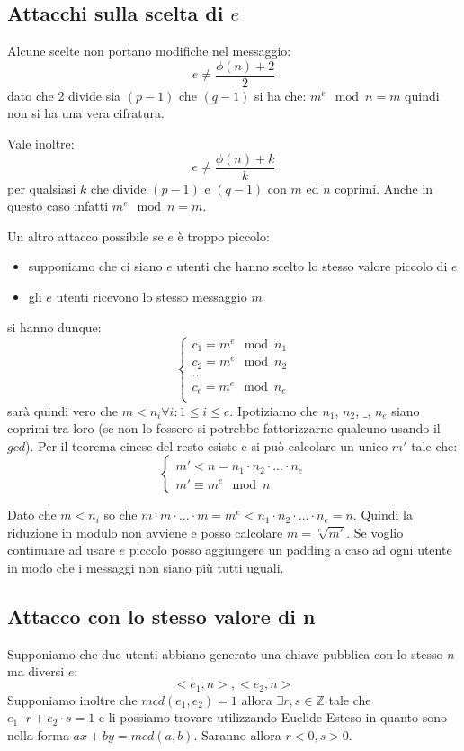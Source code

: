 \subsection{Attacchi sulla scelta di $e$}
Alcune scelte non portano modifiche nel messaggio:
$$ e \neq \frac{\phi(n) + 2}{2} $$
dato che 2 divide sia $(p-1)$ che $(q-1)$ si ha che: $ m^e \mod n = m $
quindi non si ha una vera cifratura.

Vale inoltre:
$$ e \neq \frac{\phi(n) + k}{k} $$
per qualsiasi $k$ che divide $(p-1)$ e $(q-1)$ con $m$ ed $n$ coprimi.
Anche in questo caso infatti $ m^e \mod n = m $.

Un altro attacco possibile se $e$ è troppo piccolo:
\begin{itemize}
    \item supponiamo che ci siano $e$ utenti che hanno scelto lo stesso valore piccolo di $e$
    \item gli $e$ utenti ricevono lo stesso messaggio $m$
\end{itemize}
si hanno dunque:
\begin{equation}
    \begin{cases}
    c_1 = m^e \mod n_1 \\
    c_2 = m^e \mod n_2 \\
    ... \\
    c_e = m^e \mod n_e \\
    \end{cases}
\end{equation}
sarà quindi vero che $m < n_i \forall i: 1 \leq i \leq e$.
Ipotiziamo che $n_1$, $n_2$, $\_$, $n_e$ siano coprimi tra loro (se non lo fossero si potrebbe fattorizzarne qualcuno usando il $gcd$).
Per il teorema cinese del resto esiste e si può calcolare un unico $m'$ tale che:
\begin{equation}
    \begin{cases}
    m' < n = n_1 \cdot n_2 \cdot ... \cdot n_e \\
    m' \equiv m^e \mod n
    \end{cases}
\end{equation}

Dato che $m < n_i$ so che $m \cdot m \cdot ... \cdot m = m^e < n_1 \cdot n_2 \cdot ... \cdot n_e = n$.
Quindi la riduzione in modulo non avviene e posso calcolare $m = \sqrt[e]{m'}$.
Se voglio continuare ad usare $e$ piccolo posso aggiungere un padding a caso ad ogni utente in modo che i messaggi non siano più tutti uguali.

\subsection{Attacco con lo stesso valore di n}
Supponiamo che due utenti abbiano generato una chiave pubblica con lo stesso $n$ ma diversi $e$:
$$ <e_1,n>, <e_2,n> $$
Supponiamo inoltre che $mcd(e_1, e_2) = 1$ allora $\exists r,s \in \mathbb{Z}$ tale che $e_1 \cdot r + e_2 \cdot s = 1$ e li possiamo trovare utilizzando Euclide Esteso in quanto sono nella forma $ax +by = mcd(a,b)$.
Saranno allora $r<0, s>0$.


